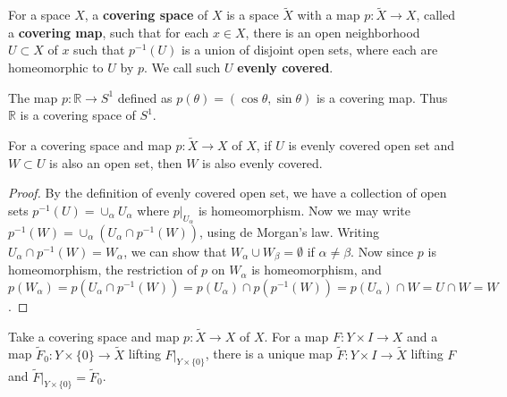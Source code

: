 \begin{defn} For a space $X$, a \textbf{covering space} of $X$ is a space $\tilde{X}$ with a map $p:\tilde{X}\rightarrow X$, called a \textbf{covering map}, such that for each $x\in X$, there is an open neighborhood $U\subset X$ of $x$ such that $p^{-1}(U)$ is a union of disjoint open sets, where each are homeomorphic to $U$ by $p$. We call such $U$ \textbf{evenly covered}.
\end{defn}

\begin{exmp} The map $p:\mathbb{R}\rightarrow S^1$ defined as $p(\theta)=(\cos\theta,\sin\theta)$ is a covering map. Thus $\mathbb{R}$ is a covering space of $S^1$.
\end{exmp}

\begin{lemma} For a covering space and map $p:\tilde{X}\rightarrow X$ of $X$, if $U$ is evenly covered open set and $W\subset U$ is also an open set, then $W$ is also evenly covered.
\end{lemma}
\begin{proof}
By the definition of evenly covered open set, we have a collection of open sets $p^{-1}(U)=\cup_{\alpha}U_\alpha$ where $p|_{U_\alpha}$ is homeomorphism. Now we may write $p^{-1}(W)=\cup_{\alpha}\left(U_\alpha\cap p^{-1}(W)\right)$, using de Morgan's law. Writing $U_\alpha\cap p^{-1}(W)=W_\alpha$, we can show that $W_\alpha\cup W_\beta=\emptyset$ if $\alpha\neq \beta$. Now since $p$ is homeomorphism, the restriction of $p$ on $W_\alpha$ is homeomorphism, and $p(W_\alpha)=p(U_\alpha\cap p^{-1}(W))=p(U_\alpha)\cap p(p^{-1}(W))=p(U_\alpha)\cap W=U\cap W=W$.
\end{proof}
\begin{lemma} Take a covering space and map $p:\tilde{X}\rightarrow X$ of $X$. For a map $F:Y\times I\rightarrow X$ and a map $\tilde{F}_0:Y\times\{0\}\rightarrow \tilde{X}$ lifting $F|_{Y\times \{0\}}$, there is a unique map $\tilde{F}:Y\times I\rightarrow \tilde{X}$ lifting $F$ and $\tilde{F}|_{Y\times \{0\}}=\tilde{F}_0$.
\end{lemma}
